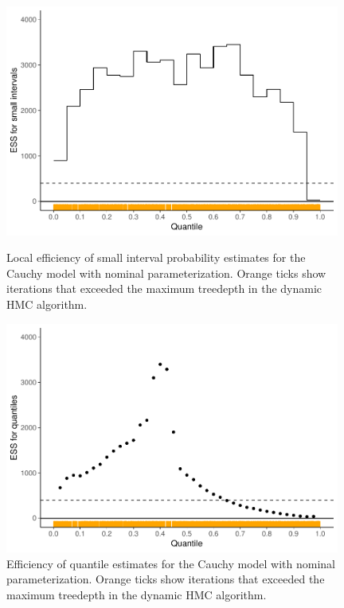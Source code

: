 \documentclass[american,]{article}
\begin{document}
\begin{figure}[tp]
  \centering
  \begin{minipage}{0.48\textwidth}
  \includegraphics[width=0.98\textwidth]{graphics/local-ess-fit-nom-1.pdf}
  \caption{Local efficiency of small interval probability
    estimates for the Cauchy model with nominal parameterization. Orange
    ticks show iterations that exceeded the maximum treedepth in
    the dynamic HMC algorithm.}
\label{fig:local-ess-fit-nom-1}
\end{minipage}
\hfill
  \begin{minipage}{0.48\textwidth}
  \includegraphics[width=0.98\textwidth]{graphics/quantile-ess-fit-nom-1.pdf}
  \caption{Efficiency of quantile estimates for the Cauchy model with nominal 
  parameterization. Orange ticks show iterations that exceeded the maximum 
  treedepth in the dynamic HMC algorithm.\\~}
  \label{fig:quantile-ess-fit-nom-1}
\end{minipage}
\end{figure}
\end{document}
